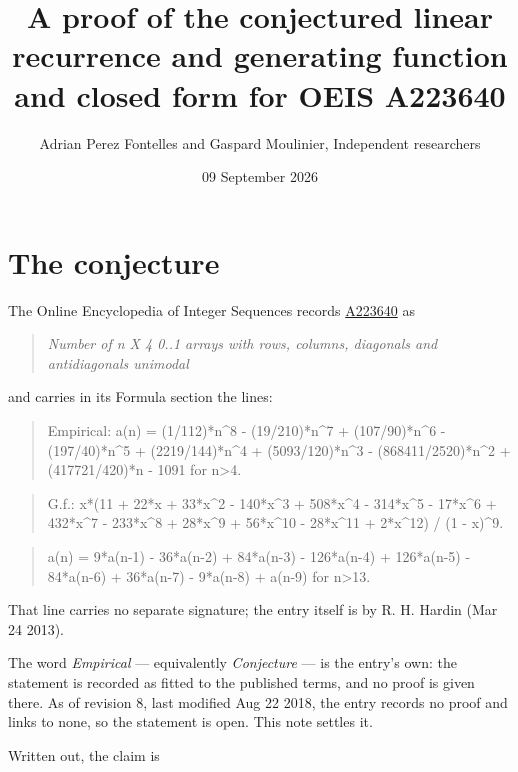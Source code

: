 \documentclass[11pt]{article}
\title{A proof of the conjectured linear recurrence and generating function and closed form for OEIS A223640}
\author{Adrian Perez Fontelles and Gaspard Moulinier, Independent researchers}
\date{09 September 2026}
\theoremstyle{definition}
\begin{document}
\maketitle
\section{The conjecture}

The Online Encyclopedia of Integer Sequences records \href{https://oeis.org/A223640}{A223640} as

\begin{quote}\itshape Number of n X 4 0..1 arrays with rows, columns, diagonals and antidiagonals unimodal\end{quote}

and carries in its Formula section the lines:

\begin{quote}\ttfamily Empirical: a(n) = (1/112)*n\textasciicircum{}8 - (19/210)*n\textasciicircum{}7 + (107/90)*n\textasciicircum{}6 - (197/40)*n\textasciicircum{}5 + (2219/144)*n\textasciicircum{}4 + (5093/120)*n\textasciicircum{}3 - (868411/2520)*n\textasciicircum{}2 + (417721/420)*n - 1091 for n>4.\end{quote}

\begin{quote}\ttfamily G.f.: x*(11 + 22*x + 33*x\textasciicircum{}2 - 140*x\textasciicircum{}3 + 508*x\textasciicircum{}4 - 314*x\textasciicircum{}5 - 17*x\textasciicircum{}6 + 432*x\textasciicircum{}7 - 233*x\textasciicircum{}8 + 28*x\textasciicircum{}9 + 56*x\textasciicircum{}10 - 28*x\textasciicircum{}11 + 2*x\textasciicircum{}12) / (1 - x)\textasciicircum{}9.\end{quote}

\begin{quote}\ttfamily a(n) = 9*a(n-1) - 36*a(n-2) + 84*a(n-3) - 126*a(n-4) + 126*a(n-5) - 84*a(n-6) + 36*a(n-7) - 9*a(n-8) + a(n-9) for n>13.\end{quote}

That line carries no separate signature; the entry itself is by R. H. Hardin (Mar 24 2013).

The word {\itshape Empirical} --- equivalently {\itshape Conjecture} --- is the entry's own: the statement is recorded as fitted to the published terms, and no proof is given there. As of revision 8, last modified Aug 22 2018, the entry records no proof and links to none, so the statement is open. This note settles it.

Written out, the claim is
\end{document}
